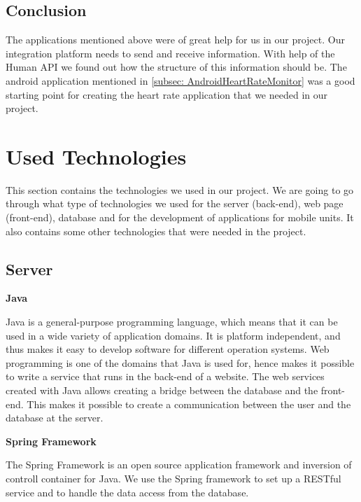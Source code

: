 \subsection{Conclusion}

The applications mentioned above were of great help for us in our project.
Our integration platform needs to send and receive information. 
With help of the Human API we found out how the structure of this information should be.
The android application mentioned in \ref{subsec: AndroidHeartRateMonitor} was a good starting point for creating the heart rate application that we needed in our project.


\section{Used Technologies}
\label{section:used-technologies}

This section contains the technologies we used in our project.
We are going to go through what type of technologies we used for the server (back-end), web page (front-end), database and for the development of applications for mobile units. 
It also contains some other technologies that were needed in the project.

\subsection{Server}

\textbf{Java} \nocite{Java}

Java is a general-purpose programming language, which means that it can be used in a wide variety of application domains.
It is platform independent, and thus makes it easy to develop software for different operation systems.
Web programming is one of the domains that Java is used for, hence makes it possible to write a service that runs in the back-end of a website.
The web services created with Java allows creating a bridge between the database and the front-end. 
This makes it possible to create a communication between the user and the database at the server.

\textbf{Spring Framework} \nocite{SpringFramework1}\nocite{SpringFramework2}

The Spring Framework is an open source application framework and inversion of controll container for Java. 
We use the Spring framework to set up a RESTful service and to handle the data access from the database. 

